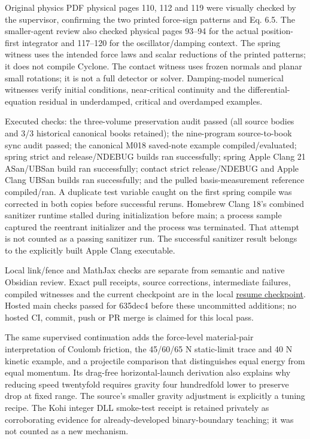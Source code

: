 Original physics PDF physical pages 110, 112 and 119 were visually checked by the supervisor, confirming the two printed force-sign patterns and Eq. 6.5. The smaller-agent review also checked physical pages 93--94 for the actual position-first integrator and 117--120 for the oscillator/damping context. The spring witness uses the intended force laws and scalar reductions of the printed patterns; it does not compile Cyclone. The contact witness uses frozen normals and planar small rotations; it is not a full detector or solver. Damping-model numerical witnesses verify initial conditions, near-critical continuity and the differential-equation residual in underdamped, critical and overdamped examples.

Executed checks: the three-volume preservation audit passed (all source bodies and 3/3 historical canonical books retained); the nine-program source-to-book sync audit passed; the canonical M018 saved-note example compiled/evaluated; spring strict and release/NDEBUG builds ran successfully; spring Apple Clang 21 ASan/UBSan build ran successfully; contact strict release/NDEBUG and Apple Clang UBSan builds ran successfully; and the pulled basis-measurement reference compiled/ran. A duplicate test variable caught on the first spring compile was corrected in both copies before successful reruns. Homebrew Clang 18's combined sanitizer runtime stalled during initialization before main; a process sample captured the reentrant initializer and the process was terminated. That attempt is not counted as a passing sanitizer run. The successful sanitizer result belongs to the explicitly built Apple Clang executable.

Local link/fence and MathJax checks are separate from semantic and native Obsidian review. Exact pull receipts, source corrections, intermediate failures, compiled witnesses and the current checkpoint are in the local \hyperref[source-file-fa72fc2a0521c00ddf3a72f0]{resume checkpoint}. Hosted main checks passed for 635dec4 before these uncommitted additions; no hosted CI, commit, push or PR merge is claimed for this local pass.

The same supervised continuation adds the force-level material-pair interpretation of Coulomb friction, the 45/60/65 N static-limit trace and 40 N kinetic example, and a projectile comparison that distinguishes equal energy from equal momentum. Its drag-free horizontal-launch derivation also explains why reducing speed twentyfold requires gravity four hundredfold lower to preserve drop at fixed range. The source's smaller gravity adjustment is explicitly a tuning recipe. The Kohi integer DLL smoke-test receipt is retained privately as corroborating evidence for already-developed binary-boundary teaching; it was not counted as a new mechanism.
